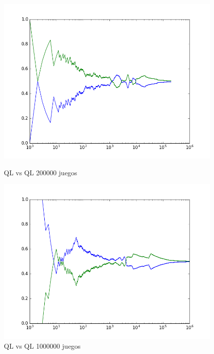 \begin{figure}[h]
 \centering
 \begin{minipage}{.45\textwidth}
	\centering
	\includegraphics[scale=0.35]{img/QlearningQlearningEgreedy200000.png}
        \caption{QL vs QL 200000 juegos}
  \end{minipage}
 \begin{minipage}{.5\textwidth}
	\centering
	\includegraphics[scale=0.35]{img/QlearningQlearningEgreedy1000000.png}
        \caption{QL vs QL 1000000 juegos}
  \end{minipage}
\end{figure}

